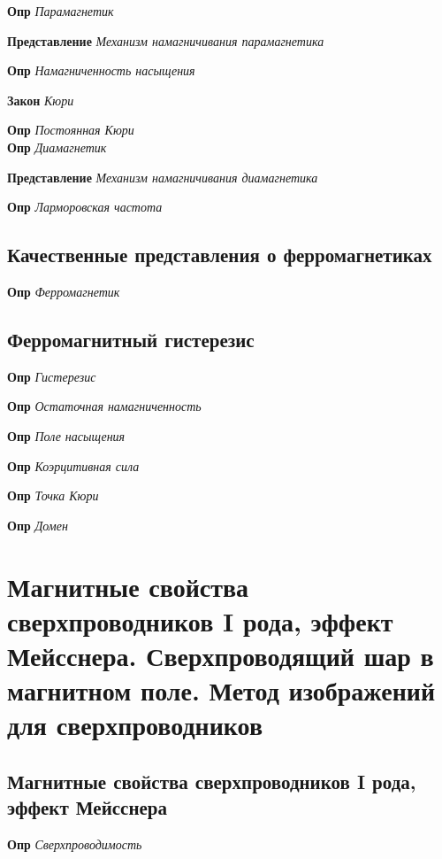 \documentclass[a4paper, 14pt]{article}
\begin{document}
    \textbf{Опр} \textit{Парамагнетик}
    
    \textbf{Представление} \textit{Механизм намагничивания парамагнетика}
    
    \textbf{Опр} \textit{Намагниченность насыщения}
    
    \textbf{Закон} \textit{Кюри}
    
    \textbf{Опр} \textit{Постоянная Кюри} \\
    
    \textbf{Опр} \textit{Диамагнетик}
    
    \textbf{Представление} \textit{Механизм намагничивания диамагнетика}
    
    \textbf{Опр} \textit{Ларморовская частота}
    
    \subsection{Качественные представления о ферромагнетиках}
    
    \textbf{Опр} \textit{Ферромагнетик}
    
    \subsection{Ферромагнитный гистерезис}
    
    \textbf{Опр} \textit{Гистерезис}
    
    \textbf{Опр} \textit{Остаточная намагниченность}
    
    \textbf{Опр} \textit{Поле насыщения}
    
    \textbf{Опр} \textit{Коэрцитивная сила}
    
    \textbf{Опр} \textit{Точка Кюри}
    
    \textbf{Опр} \textit{Домен}
    
    \section{Магнитные свойства сверхпроводников I рода, эффект Мейсснера.
    Сверхпроводящий шар в магнитном поле.
    Метод изображений для сверхпроводников}
    
    \subsection{Магнитные свойства сверхпроводников I рода, эффект Мейсснера}
    
    \textbf{Опр} \textit{Сверхпроводимость}
    
\end{document}
